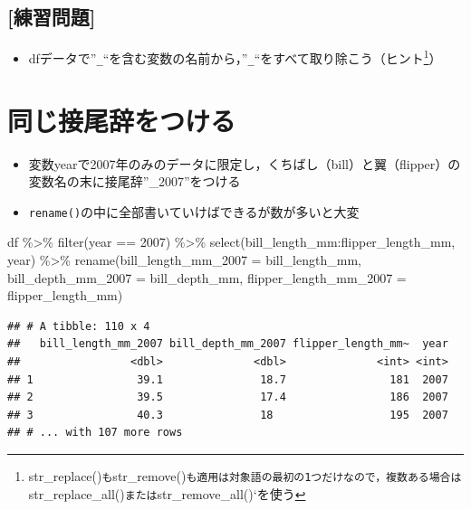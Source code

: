 \documentclass[
  xelatex,ja=standard, b5paper]{bxjsbook}
\newenvironment{Shaded}{\begin{snugshade}}{\end{snugshade}}
\newcommand{\AttributeTok}[1]{\textcolor[rgb]{0.77,0.63,0.00}{#1}}
\newcommand{\DecValTok}[1]{\textcolor[rgb]{0.00,0.00,0.81}{#1}}
\newcommand{\FunctionTok}[1]{\textcolor[rgb]{0.00,0.00,0.00}{#1}}
\newcommand{\NormalTok}[1]{#1}
\newcommand{\SpecialCharTok}[1]{\textcolor[rgb]{0.00,0.00,0.00}{#1}}
\providecommand{\tightlist}{%
  \setlength{\itemsep}{0pt}\setlength{\parskip}{0pt}}
\begin{document}
\hypertarget{ux7df4ux7fd2ux554fux984c-4}{%
\subsection{{[}練習問題{]}}\label{ux7df4ux7fd2ux554fux984c-4}}

\begin{itemize}
\tightlist
\item
  dfデータで''\texttt{\_}``を含む変数の名前から，''\texttt{\_}``をすべて取り除こう（ヒント\footnote{str\_replace()\texttt{も}str\_remove()\texttt{も適用は対象語の最初の1つだけなので，複数ある場合は}str\_replace\_all()\texttt{または}str\_remove\_all()`を使う}）
\end{itemize}

\hypertarget{rename-add}{%
\section{同じ接尾辞をつける}\label{rename-add}}

\begin{itemize}
\tightlist
\item
  変数yearで2007年のみのデータに限定し，くちばし（bill）と翼（flipper）の変数名の末に接尾辞''\_2007''をつける
\item
  \texttt{rename()}の中に全部書いていけばできるが数が多いと大変
\end{itemize}

\begin{Shaded}
\begin{Highlighting}[]
\NormalTok{df }\SpecialCharTok{\%\textgreater{}\%} 
  \FunctionTok{filter}\NormalTok{(year }\SpecialCharTok{==} \DecValTok{2007}\NormalTok{) }\SpecialCharTok{\%\textgreater{}\%} 
  \FunctionTok{select}\NormalTok{(bill\_length\_mm}\SpecialCharTok{:}\NormalTok{flipper\_length\_mm, year) }\SpecialCharTok{\%\textgreater{}\%} 
  \FunctionTok{rename}\NormalTok{(}\AttributeTok{bill\_length\_mm\_2007 =}\NormalTok{ bill\_length\_mm,}
         \AttributeTok{bill\_depth\_mm\_2007  =}\NormalTok{ bill\_depth\_mm,}
         \AttributeTok{flipper\_length\_mm\_2007 =}\NormalTok{ flipper\_length\_mm)}
\end{Highlighting}
\end{Shaded}

\begin{verbatim}
## # A tibble: 110 x 4
##   bill_length_mm_2007 bill_depth_mm_2007 flipper_length_mm~  year
##                 <dbl>              <dbl>              <int> <int>
## 1                39.1               18.7                181  2007
## 2                39.5               17.4                186  2007
## 3                40.3               18                  195  2007
## # ... with 107 more rows
\end{verbatim}
\end{document}
